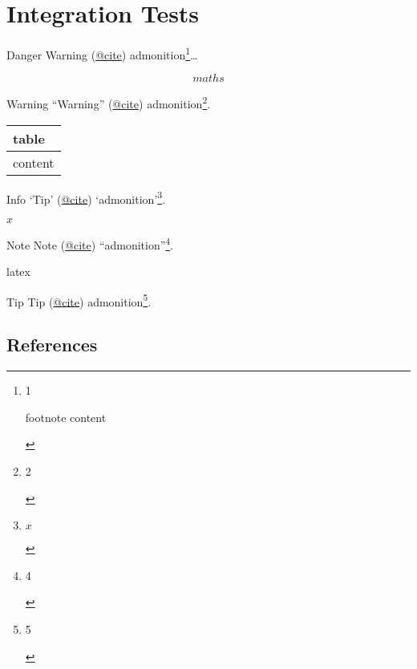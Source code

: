 \protect\hypertarget{integration-tests}{}
\section{Integration Tests}
\begin{admonition@danger}{Danger}
Warning (\protect\hyperlink{ref-cite}{@cite}) admonition\footnote{1\par
footnote content\par
\label{fn:1}}…\par
\begin{equation*}
maths
\end{equation*}
\end{admonition@danger}
\begin{admonition@warning}{Warning}
“Warning” (\protect\hyperlink{ref-cite}{@cite}) admonition\footnote{2\par
\label{fn:2}}.\par
\begin{longtable}[]{@{}l@{}}
\hline
table\tabularnewline
\hline
\endfirsthead
content\tabularnewline
\hline
\end{longtable}
\end{admonition@warning}
\begin{admonition@info}{Info}
‘Tip’ (\protect\hyperlink{ref-cite}{@cite}) ‘admonition’\footnote{\(x\)\par
\label{fn:3}}.\par
\(x\)\end{admonition@info}
\begin{admonition@note}{Note}
Note (\protect\hyperlink{ref-cite}{@cite}) “admonition”\footnote{4\par
\label{fn:4}}.\par
latex
\end{admonition@note}
\begin{admonition@tip}{Tip}
Tip (\protect\hyperlink{ref-cite}{@cite}) admonition\footnote{5\par
\label{fn:5}}.\par
\end{admonition@tip}
\protect\hypertarget{refs}{}
\subsection{References}
